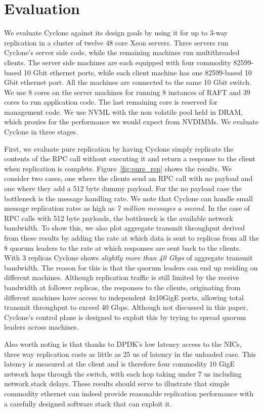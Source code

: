 \documentclass[10pt, preprint]{sigplanconf}
\begin{document}
\section{Evaluation}
We evaluate Cyclone against its design goals by using it for up to 3-way
replication in a cluster of twelve 48 core Xeon servers. Three servers run
Cyclone's server side code, while the remaining machines run multithreaded
clients. The server side machines are each equipped with four commodity
82599-based 10 Gbit ethernet ports, while each client machine has one
82599-based 10 Gbit ethernet port. All the machines are connected to the same 10
Gbit switch. We use 8 cores on the server machines for running 8 instances of
RAFT and 39 cores to run application code. The last remaining core is reserved
for management code. We use NVML with the non volatile pool held in DRAM, which
proxies for the performance we would expect from NVDIMMs. We evaluate Cyclone in
three stages.

First, we evaluate pure replication by having Cyclone simply replicate the
contents of the RPC call without executing it and return a response to the
client when replication is complete.  Figure~\ref{fig:pure_rep} shows the
results. We consider two cases, one where the clients send an RPC call with no
payload and one where they add a 512 byte dummy payload. For the no payload case
the bottleneck is the message handling rate. We note that Cyclone can handle
small message replication rates as high as \emph{7 million messages a
  second}. In the case of RPC calls with 512 byte payloads, the bottleneck is
the available network bandwidth. To show this, we also plot aggregate transmit
throughput derived from these results by adding the rate at which data is sent
to replicas from all the 8 quorum leaders to the rate at which responses are
sent back to the clients.  With 3 replicas Cyclone shows \emph{slightly more
  than 40 Gbps} of aggregate transmit bandwidth. The reason for this is that the
quorum leaders can end up residing on different machines. Although replication
traffic is still limited by the receive bandwidth at follower replicas, the
responses to the clients, originating from different machines have access to
independent 4x10GigE ports, allowing total transmit throughput to exceed 40
Gbps. Although not discussed in this paper, Cyclone's control plane is designed
to exploit this by trying to spread quorum leaders across machines.

Also worth noting is that thanks to DPDK's low latency access to the NICs, three
way replication costs as little as 25 us of latency in the unloaded case. This
latency is measured at the client and is therefore four commodity 10 GigE
network hops through the switch, with each hop taking under 7 us including
network stack delays. These results should serve to illustrate that simple
commodity ethernet can indeed provide reasonable replication performance with a
carefully designed software stack that can exploit it.
\end{document}
